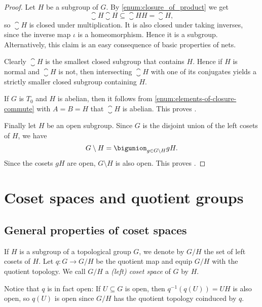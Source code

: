 \documentclass[article, a4paper, 11pt, oneside]{memoir}
\numberwithin{equation}{chapter}
\newcommand{\preim}{^{-1}}
\begin{document}
\begin{proof}
    Let $H$ be a subgroup of $G$. By \cref{enum:closure_of_product} we get
    \begin{equation*}
        \closure{H} \closure{H} \subseteq \closure{HH} = \closure{H},
    \end{equation*}
    so $\closure{H}$ is closed under multiplication. It is also closed under taking inverses, since the inverse map $\iota$ is a homeomorphism. Hence it is a subgroup. Alternatively, this claim is an easy consequence of basic properties of nets.

    Clearly $\closure{H}$ is the smallest closed subgroup that contains $H$. Hence if $H$ is normal and $\closure{H}$ is not, then intersecting $\closure{H}$ with one of its conjugates yields a strictly smaller closed subgroup containing $H$.

    If $G$ is $T_0$ and $H$ is abelian, then it follows from \cref{enum:elements-of-closure-commute} with $A = B = H$ that $\closure{H}$ is abelian. This proves .

    Finally let $H$ be an open subgroup. Since $G$ is the disjoint union of the left cosets of $H$, we have
    \begin{equation*}
        G \setminus H
            = \bigunion_{g \in G \setminus H} gH.
    \end{equation*}
    Since the cosets $gH$ are open, $G \setminus H$ is also open. This proves .
\end{proof}



\chapter{Coset spaces and quotient groups}

\section{General properties of coset spaces}

If $H$ is a subgroup of a topological group $G$, we denote by $G/H$ the set of left cosets of $H$. Let $q \colon G \to G/H$ be the quotient map and equip $G/H$ with the quotient topology. We call $G/H$ a \emph{(left) coset space} of $G$ by $H$.

Notice that $q$ is in fact open: If $U \subseteq G$ is open, then $q\preim(q(U)) = UH$ is also open, so $q(U)$ is open since $G/H$ has the quotient topology coinduced by $q$.
\end{document}
